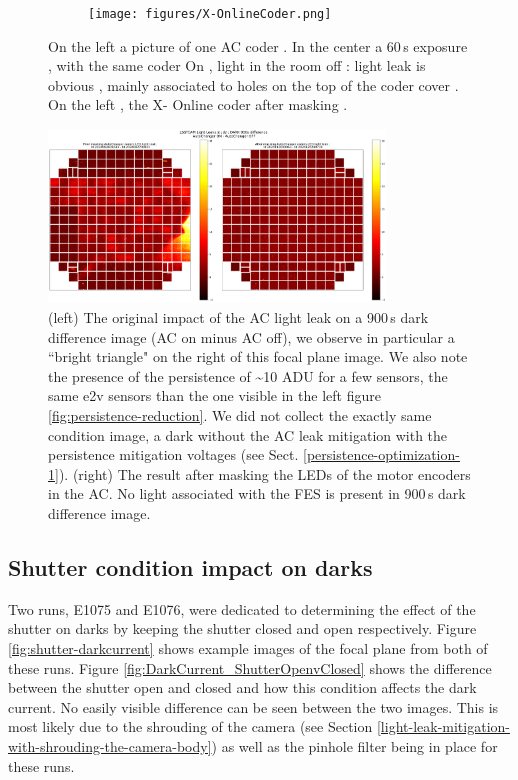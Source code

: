 \begin{figure}[ht]
\begin{subfigure}{0.32\textwidth}
\end{subfigure}
\begin{subfigure}{0.32\textwidth}
  \centering
  \texttt{[image: figures/X-OnlineCoder.png]}
\end{subfigure}
\caption{On the left a picture of one AC coder . In the center a 60\,s exposure , with the same coder On , light in the room off : light leak is obvious , mainly associated to holes on the top of the coder cover . On the left , the X- Online coder after masking .}
\label{fig:CoderLight}
\end{figure}

\begin{figure}[ht]
\begin{centering}
\includegraphics[width=0.8\textwidth]{figures/AC_LightLeak_study.png}
\caption{ (left) The original impact of the AC light leak on a 900\,s dark difference image (AC on minus AC off), we observe in particular a ``bright triangle" on the right of this focal plane image. We also note the presence of the persistence of \textasciitilde 10 ADU for a few sensors, the same e2v sensors than the one visible in the left figure \ref{fig:persistence-reduction}. We did not collect the exactly same condition image, a dark without the AC leak mitigation with the persistence mitigation voltages (see Sect. \ref{persistence-optimization-1}). (right) The result after masking the LEDs of the motor encoders in the AC.  No light associated with the FES is present in 900\,s dark difference image.  \label{fig:ac-light-leak}}
\end{centering}
\end{figure}

\subsection{Shutter condition impact on
darks}\label{shutter-condition-impact-on-darks}

Two runs, E1075 and E1076, were dedicated to determining the effect of the shutter on darks by keeping the shutter closed and open respectively. Figure \ref{fig:shutter-darkcurrent} shows example images of the focal plane from both of these runs. 
Figure \ref{fig:DarkCurrent_ShutterOpenvClosed} shows the difference between the shutter open and closed and how this condition affects the dark current.
No easily visible difference can be seen between the two images. This is most likely due to the shrouding of the camera (see Section \ref{light-leak-mitigation-with-shrouding-the-camera-body}) as well as the pinhole filter being in place for these runs.

